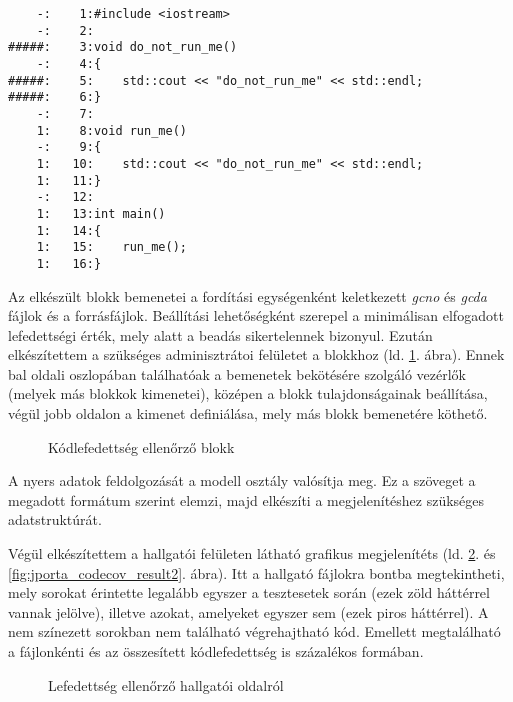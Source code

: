 \begin{lstlisting}
    -:    1:#include <iostream>
    -:    2:
#####:    3:void do_not_run_me()
    -:    4:{
#####:    5:    std::cout << "do_not_run_me" << std::endl;
#####:    6:}
    -:    7:
    1:    8:void run_me()
    -:    9:{	 
    1:   10:    std::cout << "do_not_run_me" << std::endl;
    1:   11:}
    -:   12:	 
    1:   13:int main()	 
    1:   14:{	 
    1:   15:    run_me();
    1:   16:}
\end{lstlisting}

Az elkészült blokk bemenetei a fordítási egységenként keletkezett \textit{gcno} és \textit{gcda} fájlok és a forrásfájlok. Beállítási lehetőségként szerepel a minimálisan elfogadott lefedettségi érték, mely alatt a beadás sikertelennek bizonyul. 
Ezután elkészítettem a szükséges adminisztrátoi felületet a blokkhoz (ld. \ref{fig:jporta_codecov_block}. ábra). Ennek bal oldali oszlopában találhatóak a bemenetek bekötésére szolgáló vezérlők (melyek más blokkok kimenetei), középen a blokk tulajdonságainak beállítása, végül jobb oldalon a kimenet definiálása, mely más blokk bemenetére köthető.
    
\begin{figure}[h]
    \centering
    \caption{Kódlefedettség ellenőrző blokk}
    \label{fig:jporta_codecov_block}
\end{figure} 

A nyers adatok feldolgozását a modell osztály valósítja meg. Ez a szöveget a megadott formátum szerint elemzi, majd elkészíti a megjelenítéshez szükséges adatstruktúrát.

Végül elkészítettem a hallgatói felületen látható grafikus megjelenítéts (ld. \ref{fig:jporta_codecov_result1}. és \ref{fig:jporta_codecov_result2}. ábra). Itt a hallgató fájlokra bontba megtekintheti, mely sorokat érintette legalább egyszer a tesztesetek során (ezek zöld háttérrel vannak jelölve), illetve azokat, amelyeket egyszer sem (ezek piros háttérrel). A nem színezett sorokban nem található végrehajtható kód. Emellett megtalálható a fájlonkénti és az összesített kódlefedettség is százalékos formában.

\begin{figure}[h]
    \centering
    \caption{Lefedettség ellenőrző hallgatói oldalról}
    \label{fig:jporta_codecov_result1}
\end{figure} 

